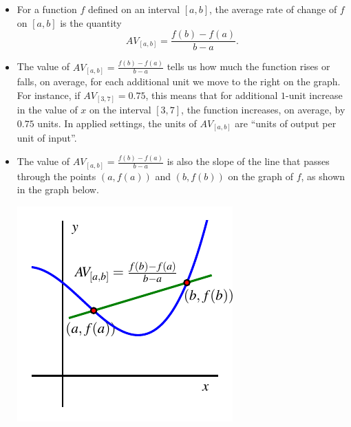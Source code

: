 \documentclass[nooutcomes]{ximera}
\begin{document}
\begin{exploration}
\begin{enumerate}[label=\alph*.]
\end{enumerate}
\end{exploration}

\begin{summary}\begin{itemize}
\item For a function \(f\) defined on an interval \([a,b]\), the average rate of change of \(f\) on \([a,b]\) is the quantity%
\begin{equation*}
AV_{[a,b]} = \frac{f(b) - f(a)}{b-a}\text{.}
\end{equation*}
\item The value of \(AV_{[a,b]} = \frac{f(b) - f(a)}{b-a}\) tells us how much the function rises or falls, on average, for each additional unit we move to the right on the graph.  For instance, if \(AV_{[3,7]} = 0.75\), this means that for additional \(1\)-unit increase in the value of \(x\) on the interval \([3,7]\), the function increases, on average, by \(0.75\) units.  In applied settings, the units of \(AV_{[a,b]}\) are ``units of output per unit of input''.
\item The value of \(AV_{[a,b]} = \frac{f(b) - f(a)}{b-a}\) is also the slope of the line that passes through the points \((a,f(a))\) and \((b,f(b))\) on the graph of \(f\), as shown in the graph below.
\begin{image}
\includegraphics{aroc-f-x-defn}
\end{image}

\end{itemize}\end{summary}
\end{document}
